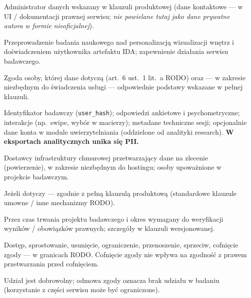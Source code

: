 \begin{description}[style=nextline]
  \item[Administrator]
  Administrator danych wskazany w klauzuli produktowej (dane kontaktowe --- w UI / dokumentacji prawnej serwisu; \emph{nie powielane tutaj jako dane prywatne autora w formie nieoficjalnej}).

  \item[Cele]
  Przeprowadzenie badania naukowego nad personalizacją wizualizacji wnętrz i doświadczeniem użytkownika artefaktu IDA; zapewnienie działania serwisu badawczego.

  \item[Podstawa]
  Zgoda osoby, której dane dotyczą (art.~6 ust.~1 lit.~a RODO) oraz --- w zakresie niezbędnym do świadczenia usługi --- odpowiednie podstawy wskazane w pełnej klauzuli.

  \item[Kategorie danych]
  Identyfikator badawczy (\texttt{user\_hash}); odpowiedzi ankietowe i psychometryczne; interakcje (np.\ swipe, wybór w macierzy); metadane techniczne sesji; opcjonalnie dane konta w module uwierzytelniania (oddzielone od analityki research). \textbf{W eksportach analitycznych unika się PII.}

  \item[Odbiorcy]
  Dostawcy infrastruktury chmurowej przetwarzający dane na zlecenie (powierzenie), w zakresie niezbędnym do hostingu; osoby upoważnione w projekcie badawczym.

  \item[Przekazanie poza EOG]
  Jeżeli dotyczy --- zgodnie z pełną klauzulą produktową (standardowe klauzule umowne / inne mechanizmy RODO).

  \item[Okres przechowywania]
  Przez czas trwania projektu badawczego i okres wymagany do weryfikacji wyników / obowiązków prawnych; szczegóły w klauzuli wersjonowanej.

  \item[Prawa osoby]
  Dostęp, sprostowanie, usunięcie, ograniczenie, przenoszenie, sprzeciw, cofnięcie zgody --- w granicach RODO. Cofnięcie zgody nie wpływa na zgodność z prawem przetwarzania przed cofnięciem.

  \item[Dobrowolność]
  Udział jest dobrowolny; odmowa zgody oznacza brak udziału w badaniu (korzystanie z części serwisu może być ograniczone).
\end{description}

